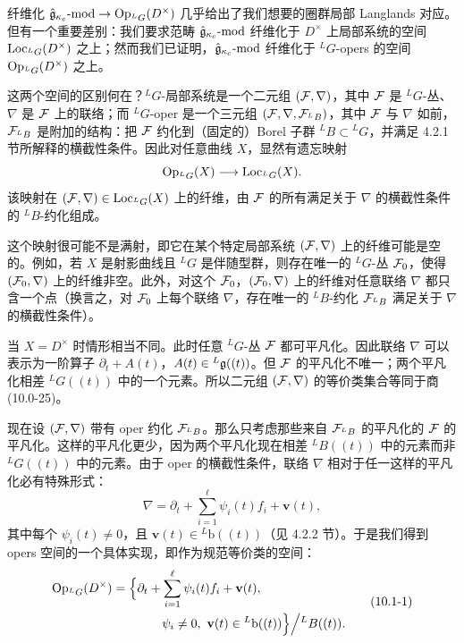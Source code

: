 纤维化 $\hat{\mathfrak{g}}_{\kappa_c}\text{-}\mathrm{mod}\to\operatorname{Op}_{{}^L G}(D^\times)$ 几乎给出了我们想要的圈群局部 Langlands 对应。但有一个重要差别：我们要求范畴 $\hat{\mathfrak{g}}_{\kappa_c}\text{-}\mathrm{mod}$ 纤维化于 $D^\times$ 上局部系统的空间 $\operatorname{Loc}_{{}^L G}(D^\times)$ 之上；然而我们已证明，$\hat{\mathfrak{g}}_{\kappa_c}\text{-}\mathrm{mod}$ 纤维化于 ${}^L G$-opers 的空间 $\operatorname{Op}_{{}^L G}(D^\times)$ 之上。

这两个空间的区别何在？${}^L G$-局部系统是一个二元组 $(\mathcal{F},\nabla)$，其中 $\mathcal{F}$ 是 ${}^L G$-丛、$\nabla$ 是 $\mathcal{F}$ 上的联络；而 ${}^L G$-oper 是一个三元组 $(\mathcal{F},\nabla,\mathcal{F}_{{}^L B})$，其中 $\mathcal{F}$ 与 $\nabla$ 如前，$\mathcal{F}_{{}^L B}$ 是附加的结构：把 $\mathcal{F}$ 约化到（固定的）Borel 子群 ${}^L B\subset{}^L G$，并满足 4.2.1 节所解释的横截性条件。因此对任意曲线 $X$，显然有遗忘映射
\[
    \operatorname{Op}_{{}^L G}(X)\longrightarrow\operatorname{Loc}_{{}^L G}(X).
\]
该映射在 $(\mathcal{F},\nabla)\in\operatorname{Loc}_{{}^L G}(X)$ 上的纤维，由 $\mathcal{F}$ 的所有满足关于 $\nabla$ 的横截性条件的 ${}^L B$-约化组成。

这个映射很可能不是满射，即它在某个特定局部系统 $(\mathcal{F},\nabla)$ 上的纤维可能是空的。例如，若 $X$ 是射影曲线且 ${}^L G$ 是伴随型群，则存在唯一的 ${}^L G$-丛 $\mathcal{F}_0$，使得 $(\mathcal{F}_0,\nabla)$ 上的纤维非空。此外，对这个 $\mathcal{F}_0$，$(\mathcal{F}_0,\nabla)$ 上的纤维对任意联络 $\nabla$ 都只含一个点（换言之，对 $\mathcal{F}_0$ 上每个联络 $\nabla$，存在唯一的 ${}^L B$-约化 $\mathcal{F}_{{}^L B}$ 满足关于 $\nabla$ 的横截性条件）。

当 $X=D^\times$ 时情形相当不同。此时任意 ${}^L G$-丛 $\mathcal{F}$ 都可平凡化。因此联络 $\nabla$ 可以表示为一阶算子 $\partial_t+A(t)$，$A(t)\in{}^L\mathfrak{g}((t))$。但 $\mathcal{F}$ 的平凡化不唯一；两个平凡化相差 ${}^L G((t))$ 中的一个元素。所以二元组 $(\mathcal{F},\nabla)$ 的等价类集合等同于商 (10.0-25)。

现在设 $(\mathcal{F},\nabla)$ 带有 oper 约化 $\mathcal{F}_{{}^L B}$。那么只考虑那些来自 $\mathcal{F}_{{}^L B}$ 的平凡化的 $\mathcal{F}$ 的平凡化。这样的平凡化更少，因为两个平凡化现在相差 ${}^L B((t))$ 中的元素而非 ${}^L G((t))$ 中的元素。由于 oper 的横截性条件，联络 $\nabla$ 相对于任一这样的平凡化必有特殊形式：
\[
    \nabla=\partial_t+\sum_{i=1}^{\ell}\psi_i(t)f_i+\mathbf{v}(t),
\]
其中每个 $\psi_i(t)\neq0$，且 $\mathbf{v}(t)\in{}^L\mathrm{b}((t))$（见 4.2.2 节）。于是我们得到 opers 空间的一个具体实现，即作为规范等价类的空间：
\begin{equation}
\begin{aligned}
    \Op_{{}^L G}(D^\times)
    &=\Bigl\{\partial_t+\sum_{i=1}^{\ell}\psi_i(t)f_i+\mathbf{v}(t),\\
    &\qquad\qquad \psi_i\neq0,\ \mathbf{v}(t)\in{}^L\mathrm{b}((t))\Bigr\}\Big/{}^L B((t)).
\end{aligned}
    \tag{10.1-1}
\end{equation}


